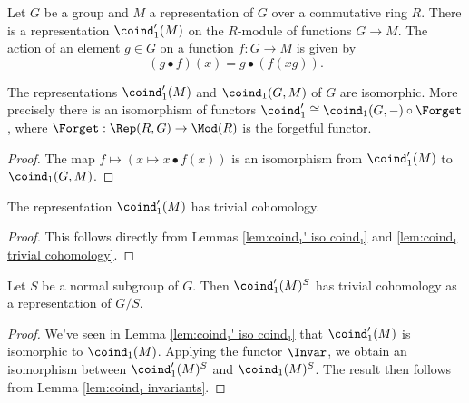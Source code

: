 \begin{definition} \label{def:coind₁'}
	\leanok
	Let $G$ be a group and $M$ a representation of $G$ over a commutative ring $R$.
	There is a representation $\coind_1' (M)$ on the $R$-module of
	functions $G \to M$.
	The action of an element $g \in G$ on a function $f : G \to M$ is given by
	\[
		(g \bullet f)(x) = g \bullet (f (xg)).
	\]
\end{definition}

\begin{lemma}	\label{lem:coind₁' iso coind₁}
	\leanok
	The representations $\coind_1'(M)$ and $\coind_1(G,M)$ of $G$ are isomorphic.
	More precisely there is an isomorphism of functors
	$\coind_1' \cong \coind_1(G,-) \circ \Forget$, where $\Forget : \Rep(R,G) \to \Mod(R)$
	is the forgetful functor.
\end{lemma}

\begin{proof}
	\leanok
	The map $f \mapsto (x \mapsto x \bullet f(x))$ is an isomorphism
	from $\coind_1'(M)$ to $\coind_1(G,M)$.
\end{proof}

\begin{corollary}	\label{cor:coind₁' trivial cohomology}
	\leanok
	The representation $\coind_1'(M)$ has trivial cohomology.
\end{corollary}

\begin{proof}
	\leanok
	This follows directly from Lemmas \ref{lem:coind₁' iso coind₁}
	and \ref{lem:coind₁ trivial cohomology}.
	\leanok
\end{proof}

\begin{corollary}	\label{cor:coind₁' invariants trivial cohomology}
	\leanok
	Let $S$ be a normal subgroup of $G$. Then $\coind_1'(M)^S$ has trivial cohomology as a
	representation of $G/S$.
\end{corollary}

\begin{proof}
	\leanok
	We've seen in Lemma \ref{lem:coind₁' iso coind₁} that $\coind_1'(M)$
	is isomorphic to $\coind_1(M)$.
	Applying the functor $\Invar$, we obtain an isomorphism between $\coind_1'(M)^S$ and $\coind_1(M)^S$.
	The result then follows from Lemma \ref{lem:coind₁ invariants}.
\end{proof}

